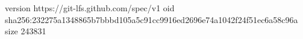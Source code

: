 version https://git-lfs.github.com/spec/v1
oid sha256:232275a1348865b7bbbd105a5c91cc9916ed2696e74a1042f24f51ec6a58c96a
size 243831
